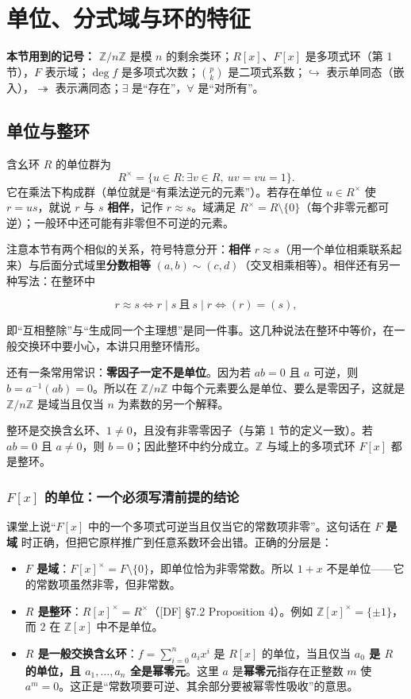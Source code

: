 \section{单位、分式域与环的特征}


\textbf{本节用到的记号：} $\mathbb Z/n\mathbb Z$ 是模 $n$ 的剩余类环；$R[x]$、$F[x]$ 是多项式环（第 1 节），$F$ 表示域；$\deg f$ 是多项式次数；$\binom pk$ 是二项式系数；$\hookrightarrow$ 表示单同态（嵌入），$\twoheadrightarrow$ 表示满同态；$\exists$ 是“存在”，$\forall$ 是“对所有”。

\subsection{单位与整环}


含幺环 $R$ 的单位群为
\[R^\times=\{u\in R:\exists v\in R,\ uv=vu=1\}.\]
它在乘法下构成群（单位就是“有乘法逆元的元素”）。若存在单位 $u\in R^\times$ 使 $r=us$，就说 $r$ 与 $s$ \textbf{相伴}，记作 $r\approx s$。域满足 $R^\times=R\setminus\{0\}$（每个非零元都可逆）；一般环中还可能有非零但不可逆的元素。

注意本节有两个相似的关系，符号特意分开：\textbf{相伴} $r\approx s$（用一个单位相乘联系起来）与后面分式域里\textbf{分数相等} $(a,b)\sim(c,d)$（交叉相乘相等）。相伴还有另一种写法：在整环中

\[
r\approx s\iff r\mid s\ \text{且}\ s\mid r\iff (r)=(s),
\]

即“互相整除”与“生成同一个主理想”是同一件事。这几种说法在整环中等价，在一般交换环中要小心，本讲只用整环情形。

还有一条常用常识：\textbf{零因子一定不是单位}。因为若 $ab=0$ 且 $a$ 可逆，则 $b=a^{-1}(ab)=0$。所以在 $\mathbb Z/n\mathbb Z$ 中每个元素要么是单位、要么是零因子，这就是 $\mathbb Z/n\mathbb Z$ 是域当且仅当 $n$ 为素数的另一个解释。

整环是交换含幺环、$1\ne0$，且没有非零零因子（与第 1 节的定义一致）。若 $ab=0$ 且 $a\ne0$，则 $b=0$；因此整环中约分成立。$\mathbb Z$ 与域上的多项式环 $F[x]$ 都是整环。

\subsubsection{$F[x]$ 的单位：一个必须写清前提的结论}


课堂上说“$F[x]$ 中的一个多项式可逆当且仅当它的常数项非零”。这句话在 \textbf{$F$ 是域} 时正确，但把它原样推广到任意系数环会出错。正确的分层是：

\begin{itemize}
\item \textbf{$F$ 是域}：$F[x]^\times=F\setminus\{0\}$，即单位恰为非零常数。所以 $1+x$ 不是单位——它的常数项虽然非零，但非常数。
\item \textbf{$R$ 是整环}：$R[x]^\times=R^\times$（[DF] §7.2 Proposition 4）。例如 $\mathbb Z[x]^\times=\{\pm1\}$，而 $2$ 在 $\mathbb Z[x]$ 中不是单位。
\item \textbf{$R$ 是一般交换含幺环}：$f=\sum_{i=0}^n a_ix^i$ 是 $R[x]$ 的单位，当且仅当 \textbf{$a_0$ 是 $R$ 的单位，且 $a_1,\dots,a_n$ 全是幂零元}。这里 $a$ 是\textbf{幂零元}指存在正整数 $m$ 使 $a^m=0$。这正是“常数项要可逆、其余部分要被幂零性吸收”的意思。
\end{itemize}


